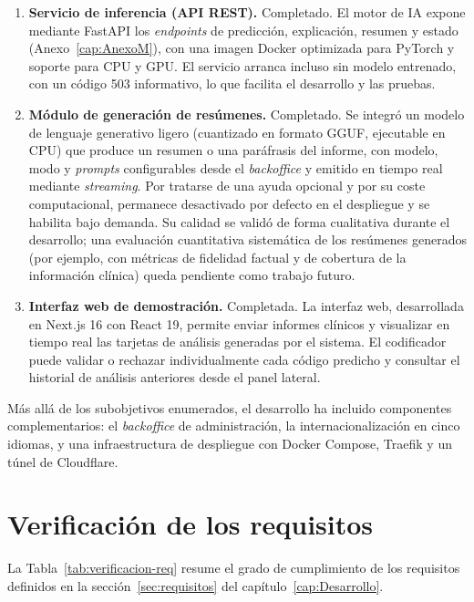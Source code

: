 \begin{enumerate}
 \item \textbf{Servicio de inferencia (API REST).} Completado. El motor de IA expone mediante FastAPI los \emph{endpoints} de predicción, explicación, resumen y estado (Anexo~\ref{cap:AnexoM}), con una imagen Docker optimizada para PyTorch y soporte para CPU y GPU. El servicio arranca incluso sin modelo entrenado, con un código 503 informativo, lo que facilita el desarrollo y las pruebas.

 \item \textbf{Módulo de generación de resúmenes.} Completado. Se integró un modelo de lenguaje generativo ligero (cuantizado en formato GGUF, ejecutable en CPU) que produce un resumen o una paráfrasis del informe, con modelo, modo y \emph{prompts} configurables desde el \emph{backoffice} y emitido en tiempo real mediante \emph{streaming}. Por tratarse de una ayuda opcional y por su coste computacional, permanece desactivado por defecto en el despliegue y se habilita bajo demanda. Su calidad se validó de forma cualitativa durante el desarrollo; una evaluación cuantitativa sistemática de los resúmenes generados (por ejemplo, con métricas de fidelidad factual y de cobertura de la información clínica) queda pendiente como trabajo futuro.

 \item \textbf{Interfaz web de demostración.} Completada. La interfaz web, desarrollada en Next.js 16 con React 19, permite enviar informes clínicos y visualizar en tiempo real las tarjetas de análisis generadas por el sistema. El codificador puede validar o rechazar individualmente cada código predicho y consultar el historial de análisis anteriores desde el panel lateral.
\end{enumerate}

Más allá de los subobjetivos enumerados, el desarrollo ha incluido componentes complementarios: el \emph{backoffice} de administración, la internacionalización en cinco idiomas, y una infraestructura de despliegue con Docker Compose, Traefik y un túnel de Cloudflare.

\section{Verificación de los requisitos}

La Tabla~\ref{tab:verificacion-req} resume el grado de cumplimiento de los requisitos definidos en la sección~\ref{sec:requisitos} del capítulo~\ref{cap:Desarrollo}.

